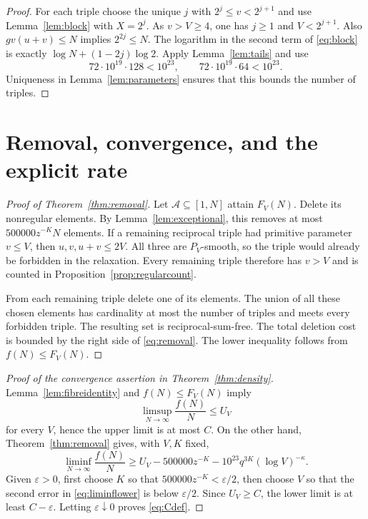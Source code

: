 \documentclass[11pt]{amsart}
\theoremstyle{definition}
\theoremstyle{remark}
\numberwithin{equation}{section}
\newcommand{\eps}{\varepsilon}
\newcommand{\cA}{\mathcal A}
\begin{document}
\begin{proof}
For each triple choose the unique $j$ with $2^j\le v<2^{j+1}$ and use Lemma~\ref{lem:block} with $X=2^j$.
As $v>V\ge4$, one has $j\ge1$ and $V<2^{j+1}$.
Also $gv(u+v)\le N$ implies $2^{2j}\le N$.
The logarithm in the second term of \eqref{eq:block} is exactly
$\log N+(1-2j)\log2$.
Apply Lemma~\ref{lem:tails} and use
\[
72\cdot10^{19}\cdot128<10^{23},
\qquad 72\cdot10^{19}\cdot64<10^{23}.
\]
Uniqueness in Lemma~\ref{lem:parameters} ensures that this bounds the number of triples.
\end{proof}

\section{Removal, convergence, and the explicit rate}\label{sec:removal}

\begin{proof}[Proof of Theorem~\ref{thm:removal}]
Let $\cA\subseteq[1,N]$ attain $F_V(N)$.
Delete its nonregular elements.
By Lemma~\ref{lem:exceptional}, this removes at most $500000z^{-K}N$ elements.
If a remaining reciprocal triple had primitive parameter $v\le V$, then
$u,v,u+v\le2V$.
All three are $P_V$-smooth, so the triple would already be forbidden in the relaxation.
Every remaining triple therefore has $v>V$ and is counted in Proposition~\ref{prop:regularcount}.

From each remaining triple delete one of its elements.
The union of all these chosen elements has cardinality at most the number of triples and meets every forbidden triple.
The resulting set is reciprocal-sum-free.
The total deletion cost is bounded by the right side of \eqref{eq:removal}.
The lower inequality follows from $f(N)\le F_V(N)$.
\end{proof}

\begin{proof}[Proof of the convergence assertion in Theorem~\ref{thm:density}]
Lemma~\ref{lem:fibreidentity} and $f(N)\le F_V(N)$ imply
\[
\limsup_{N\to\infty}\frac{f(N)}N\le U_V
\]
for every $V$, hence the upper limit is at most $C$.
On the other hand, Theorem~\ref{thm:removal} gives, with $V,K$ fixed,
\begin{equation}\label{eq:liminflower}
\liminf_{N\to\infty}\frac{f(N)}N
\ge U_V-500000z^{-K}-10^{23}q^{3K}(\log V)^{-\kappa}.
\end{equation}
Given $\eps>0$, first choose $K$ so that $500000z^{-K}<\eps/2$, then choose $V$ so that the second error in \eqref{eq:liminflower} is below $\eps/2$.
Since $U_V\ge C$, the lower limit is at least $C-\eps$.
Letting $\eps\downarrow0$ proves \eqref{eq:Cdef}.
\end{proof}
\end{document}
